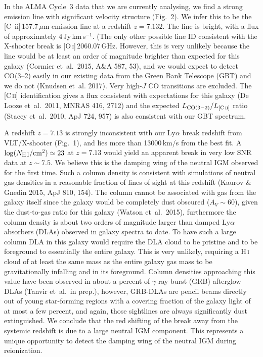 \documentclass[letter,12pt]{article}
\begin{document}
\hspace{1cm} In the ALMA Cycle~3 data that we are
currently analysing, we find a strong emission line with
significant velocity structure
(Fig.~2). We infer this to be the [C\,{\sc
ii}]\,157.7\,$\mu$m emission line at a redshift $z=7.132$. The line is bright, with a flux of approximately 4\,Jy\,km\,s$^{-1}$.
(The only other possible line ID consistent with the X-shooter break is [O\,\textsc{i}]\,2060.07\,GHz. However, this is very unlikely because the line would be at least an order of magnitude brighter than expected for this galaxy (Cormier et~al.\ 2015, A\&A 587, 53), %
and we would expect to detect CO(3--2) easily in our existing data from the Green Bank Telescope (GBT) and we do not (Knudsen et~al. 2017). %
Very high-$J$ CO transitions are excluded. 
The [C\,\textsc{ii}] identification gives a flux consistent with expectations for this galaxy (De Looze et~al.\ 2011, MNRAS 416, 2712) %
and the expected $L_{\rm CO(3-2)}/L_{\rm [C\,\textsc{ii}]}$ ratio (Stacey et~al.\ 2010, ApJ 724, 957) %
is also consistent with our GBT spectrum.

\hspace{1cm} A redshift $z=7.13$ is strongly inconsistent with our Ly$\alpha$
break redshift from VLT/X-shooter (Fig.~1), and lies more than
13000\,km/s from the best fit.  A $\log(N_{{\rm H\,I}}/{\rm cm}^2)\simeq23$
at $z=7.13$ would yield an apparent break in very low SNR data at
$z\sim7.5$.  We believe this is the damping wing of the neutral IGM observed
for the first time.  Such a column density is consistent with simulations of
neutral gas densities in a reasonable fraction of lines of sight at this
redshift (Kaurov \& Gnedin 2015, ApJ 810, 154).  The column cannot be
associated with gas from the galaxy itself since the galaxy would be
completely dust obscured ($A_V \sim 60$), given the dust-to-gas ratio for
this galaxy (Watson et~al.\ 2015), furthermore the column density is about
two orders of magnitude larger than damped Ly$\alpha$ absorbers (DLAs)
observed in galaxy spectra to date.  To have such a large column DLA in this
galaxy would require the DLA cloud to be pristine and to be foreground to
essentially the entire galaxy.  This is very unlikely, requiring a
H\,\textsc{i} cloud of at least the same mass as the entire galaxy gas mass
to be gravitationally infalling and in its foreground.  Column densities
approaching this value have been observed in about a percent of $\gamma$-ray
burst (GRB) afterglow DLAs (Tanvir et~al.\ in prep.), however, GRB-DLAs are
pencil beams directly out of young star-forming regions with a covering
fraction of the galaxy light of at most a few percent, and again, those
sightlines are always significantly dust extinguished.  We conclude
that the red shifting of the break away from the systemic redshift is due to
a large neutral IGM component.  This represents a unique opportunity to
detect the damping wing of the neutral IGM during reionization.
\end{document}
